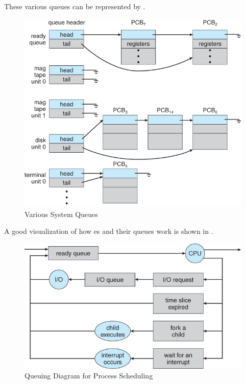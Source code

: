 These various queues can be represented by .
\begin{figure}[h!tbp]
  \centering
  \includegraphics[scale=1.00]{./Drawings/EDAF35-Operating_Systems/Queues.jpg}
  \caption{Various System Queues}
  \label{fig:Queues}
\end{figure}

A good visualization of how es and their queues work is shown in .

\begin{figure}[h!tbp]
  \centering
  \includegraphics[scale=1.00]{./Drawings/EDAF35-Operating_Systems/Queuing_Diagram.jpg}
  \caption{Queuing Diagram for Process Scheduling}
  \label{fig:Queuing_Diagram}
\end{figure}

